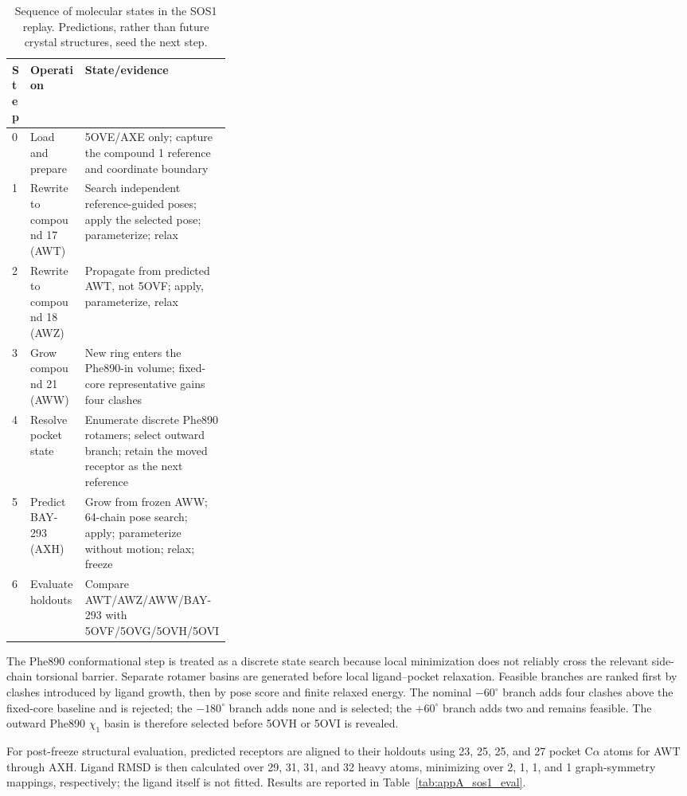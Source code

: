 \documentclass[11pt]{article}
\begin{document}
\begin{small}
\begin{table}[htbp]
\centering\small
\caption{Sequence of molecular states in the SOS1 replay. Predictions, rather than future crystal structures, seed the next step.}
\label{tab:appA_sos1_beats}
\begin{tabularx}{\linewidth}{@{}p{0.07\linewidth}p{0.25\linewidth}X@{}}
\toprule
\textbf{Step} & \textbf{Operation} & \textbf{State/evidence}\\
\midrule
0 & Load and prepare & 5OVE/AXE only; capture the compound 1 reference and coordinate boundary\\
1 & Rewrite to compound 17 (AWT) & Search independent reference-guided poses; apply the selected pose; parameterize; relax\\
2 & Rewrite to compound 18 (AWZ) & Propagate from predicted AWT, not 5OVF; apply, parameterize, relax\\
3 & Grow compound 21 (AWW) & New ring enters the Phe890-in volume; fixed-core representative gains four clashes\\
4 & Resolve pocket state & Enumerate discrete Phe890 rotamers; select outward branch; retain the moved receptor as the next reference\\
5 & Predict BAY-293 (AXH) & Grow from frozen AWW; 64-chain pose search; apply; parameterize without motion; relax; freeze\\
6 & Evaluate holdouts & Compare AWT/AWZ/AWW/BAY-293 with 5OVF/5OVG/5OVH/5OVI\\
\bottomrule
\end{tabularx}
\end{table}

The Phe890 conformational step is treated as a discrete state search because local minimization does not reliably cross the relevant side-chain torsional barrier. Separate rotamer basins are generated before local ligand--pocket relaxation. Feasible branches are ranked first by clashes introduced by ligand growth, then by pose score and finite relaxed energy. The nominal $-60^{\circ}$ branch adds four clashes above the fixed-core baseline and is rejected; the $-180^{\circ}$ branch adds none and is selected; the $+60^{\circ}$ branch adds two and remains feasible. The outward Phe890 $\chi_1$ basin is therefore selected before 5OVH or 5OVI is revealed.

For post-freeze structural evaluation, predicted receptors are aligned to their holdouts using 23, 25, 25, and 27 pocket C$\alpha$ atoms for AWT through AXH. Ligand RMSD is then calculated over 29, 31, 31, and 32 heavy atoms, minimizing over 2, 1, 1, and 1 graph-symmetry mappings, respectively; the ligand itself is not fitted. Results are reported in Table~\ref{tab:appA_sos1_eval}.


\end{small}
\end{document}

